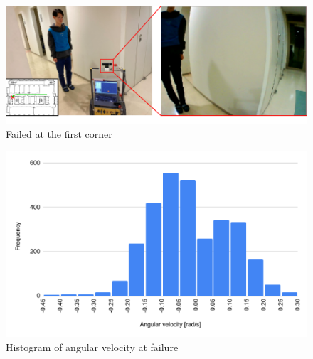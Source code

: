   \begin{figure}[h]
    \centering
    \includegraphics[keepaspectratio, scale=0.80] {images/RobotGuidance_failed_place.png}
    \captionsetup{justification=raggedright} %
    \caption{Failed at the first corner}
    \label{Fig:RobotGuidance_failed_place}
  \end{figure}

  \begin{figure}[h]
    \centering
    \includegraphics[keepaspectratio, scale=0.60] {images/RobotGuidance_failed_histogram.png}
    \captionsetup{justification=raggedright} %
    \caption{Histogram of angular velocity at failure}
    \label{Fig:RobotGuidance_failed_histogram}
  \end{figure}

\newpage
